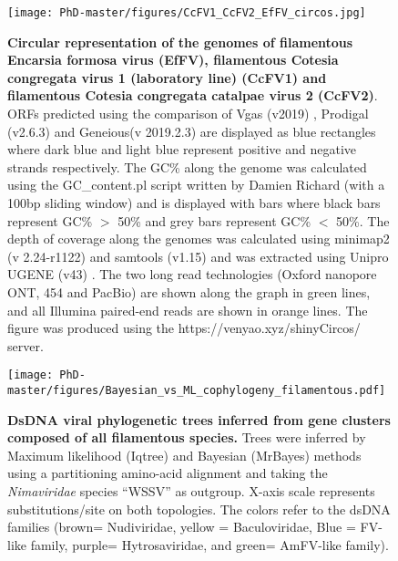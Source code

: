 \begin{landscape}
    
\begin{figure}[!htpbt]
\texttt{[image: PhD-master/figures/CcFV1\_CcFV2\_EfFV\_circos.jpg]}\centering
\caption[Paper2:Complete circularized filmentous genomes]{\textbf{Circular representation of the genomes of filamentous Encarsia formosa virus (EfFV), filamentous Cotesia congregata virus 1 (laboratory line) (CcFV1) and filamentous Cotesia congregata catalpae virus 2 (CcFV2)}. ORFs predicted using the comparison of Vgas (v2019) \citep{zhang_vgas_2019}, Prodigal (v2.6.3) \citep{hyatt_prodigal_2010} and Geneious(v 2019.2.3) \citep{kearse_geneious_2012} are displayed as blue rectangles where dark blue and light blue represent positive and negative strands respectively. The GC\% along the genome was calculated using the GC\_content.pl script written by Damien Richard (with a 100bp sliding window) and is displayed with bars where black bars represent GC\% $>$ 50\% and grey bars represent GC\% $<$ 50\%. The depth of coverage along the genomes was calculated using minimap2 (v 2.24-r1122) \citep{li_minimap2_2018} and samtools (v1.15) \citep{danecek_twelve_2021} and was extracted using Unipro UGENE (v43) \citep{okonechnikov_unipro_2012}. The two long read technologies (Oxford nanopore ONT, 454 and PacBio) are shown along the graph in green lines, and all Illumina paired-end reads are shown in orange lines. The figure was produced using the https://venyao.xyz/shinyCircos/ server.}
\label{figure:CcFV1_CcFV2_EfFV_circos}
\end{figure}

\end{landscape}

\begin{figure}[!htpbt]
\texttt{[image: PhD-master/figures/Bayesian\_vs\_ML\_cophylogeny\_filamentous.pdf]}\centering
\caption[Paper2:dsDNA \textit{Naldaviricetes} phylogeny "core-genes method"]{\textbf{DsDNA viral phylogenetic trees inferred from gene clusters composed of all filamentous species.} Trees were inferred by Maximum likelihood (Iqtree) and Bayesian (MrBayes) methods using a partitioning amino-acid alignment and taking the \textit{Nimaviridae} species “WSSV” as outgroup. X-axis scale represents substitutions/site on both topologies. The colors refer to the dsDNA families (brown= Nudiviridae, yellow = Baculoviridae, Blue = FV-like family, purple= Hytrosaviridae, and green= AmFV-like family).}
\label{figure:Bayesian_vs_ML_cophylogeny_filamentous}
\end{figure}

